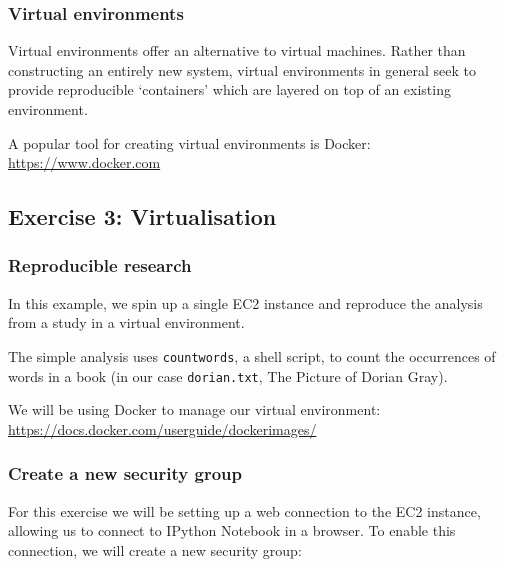 \subsubsection{Virtual environments}\label{virtual-environments}

Virtual environments offer an alternative to virtual machines. Rather
than constructing an entirely new system, virtual environments in
general seek to provide reproducible `containers' which are layered on
top of an existing environment.

A popular tool for creating virtual environments is
Docker:\\\href{https://www.docker.com/}{https://www.docker.com}

\subsection{Exercise 3: Virtualisation}\label{exercise-3-virtualisation}

\subsubsection{Reproducible research}\label{reproducible-research-1}

In this example, we spin up a single EC2 instance and reproduce the
analysis from a study in a virtual environment.

The simple analysis uses \texttt{countwords}, a shell script, to count
the occurrences of words in a book (in our case \texttt{dorian.txt}, The
Picture of Dorian Gray).

We will be using Docker to manage our virtual environment:
\url{https://docs.docker.com/userguide/dockerimages/}

\subsubsection{Create a new security
group}\label{create-a-new-security-group}

For this exercise we will be setting up a web connection to the EC2
instance, allowing us to connect to IPython Notebook in a browser. To
enable this connection, we will create a new security group:

\begin{Shaded}
\begin{Highlighting}[]
\NormalTok{$ }  \NormalTok{\textbackslash{}}
     
\end{Highlighting}
\end{Shaded}

